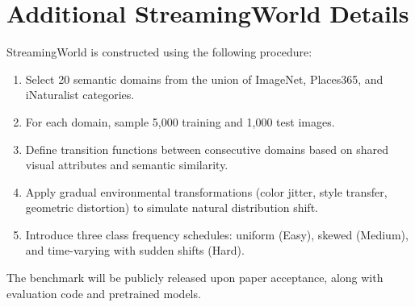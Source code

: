 \documentclass[11pt]{article}
\begin{document}
\section{Additional StreamingWorld Details}
\label{app:streaming}

StreamingWorld is constructed using the following procedure:
\begin{enumerate}
    \item Select 20 semantic domains from the union of ImageNet, Places365, and iNaturalist categories.
    \item For each domain, sample 5,000 training and 1,000 test images.
    \item Define transition functions between consecutive domains based on shared visual attributes and semantic similarity.
    \item Apply gradual environmental transformations (color jitter, style transfer, geometric distortion) to simulate natural distribution shift.
    \item Introduce three class frequency schedules: uniform (Easy), skewed (Medium), and time-varying with sudden shifts (Hard).
\end{enumerate}

The benchmark will be publicly released upon paper acceptance, along with evaluation code and pretrained models.
\end{document}
